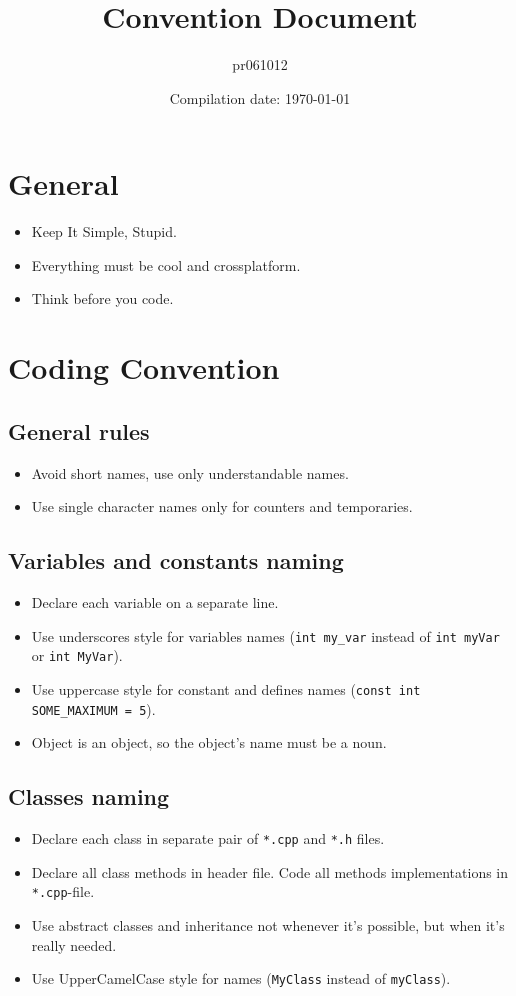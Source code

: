\documentclass[12pt]{article}
\title{Convention Document}
\author{pr061012}
\date{Compilation date: \today}
\newcommand{\code}[1]{\colorbox{verylightgray}{\lstinline!#1!}}
\begin{document}
	\maketitle

	\section{General}
		\begin{itemize}
			\item Keep It Simple, Stupid.
			\item Everything must be cool and crossplatform.
			\item Think before you code.
		\end{itemize}

	\section{Coding Convention}
		\subsection{General rules}
			\begin{itemize}
				\item Avoid short names, use only understandable names.
				\item Use single character names only for counters and temporaries.
			\end{itemize}

		\subsection{Variables and constants naming}
			\begin{itemize}
				\item Declare each variable on a separate line.
				\item Use underscores style for variables names (\code{int my_var} instead of \code{int myVar} or \code{int MyVar}).
				\item Use uppercase style for constant and defines names (\code{const int SOME_MAXIMUM = 5}).
				\item Object is an object, so the object's name must be a noun.
			\end{itemize}

		\subsection{Classes naming}
			\begin{itemize}
				\item Declare each class in separate pair of \code{*.cpp} and \code{*.h} files.
				\item Declare all class methods in header file. Code all methods implementations in \code{*.cpp}-file.
				\item Use abstract classes and inheritance not whenever it's possible, but when it's really needed.
				\item Use UpperCamelCase style for names (\code{MyClass} instead of \code{myClass}).
			\end{itemize}
\end{document}
